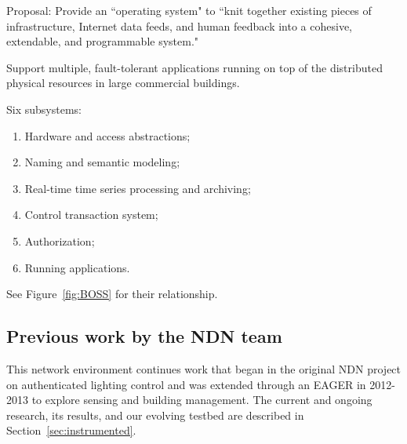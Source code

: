 Proposal: Provide an ``operating system" to ``knit together existing pieces of infrastructure, Internet data feeds, and human feedback into a cohesive, extendable, and programmable system." 

Support multiple, fault-tolerant applications running on top of the distributed physical resources in large commercial buildings. 

Six subsystems:
\begin{enumerate}
\item Hardware and access abstractions;
\item Naming and semantic modeling;
\item Real-time time series processing and archiving;
\item Control transaction system;
\item Authorization;
\item Running applications.
\end{enumerate}

See Figure~\ref{fig:BOSS} for their relationship. 

\subsection{Previous work by the NDN team}

This network environment continues work that began in the original NDN project on authenticated lighting control and was extended through an EAGER in 2012-2013 to explore sensing and building management.  The current and ongoing research, its results, and our evolving testbed are described in Section~\ref{sec:instrumented}.  

